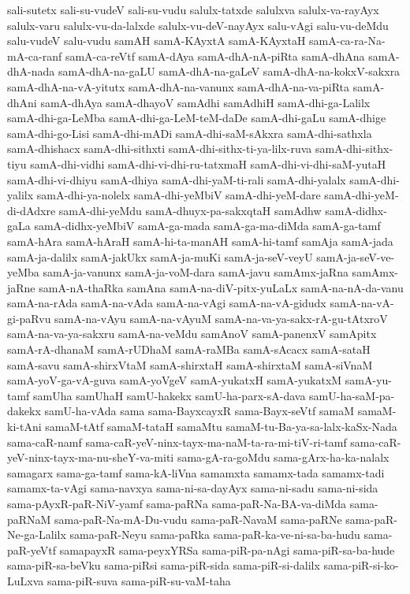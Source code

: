 {sali-sutetx
sali-su-vudeV
sali-su-vudu
salulx-tatxde
salulxva
salulx-va-rayAyx
salulx-varu
salulx-vu-da-lalxde
salulx-vu-deV-nayAyx
salu-vAgi
salu-vu-deMdu
salu-vudeV
salu-vudu
samAH
samA-KAyxtA
samA-KAyxtaH
samA-ca-ra-Na-mA-ca-ranf
samA-ca-reVtf
samA-dAya
samA-dhA-nA-piRta
samA-dhAna
samA-dhA-nada
samA-dhA-na-gaLU
samA-dhA-na-gaLeV
samA-dhA-na-kokxV-sakxra
samA-dhA-na-vA-yitutx
samA-dhA-na-vanunx
samA-dhA-na-va-piRta
samA-dhAni
samA-dhAya
samA-dhayoV
samAdhi
samAdhiH
samA-dhi-ga-Lalilx
samA-dhi-ga-LeMba
samA-dhi-ga-LeM-teM-daDe
samA-dhi-gaLu
samA-dhige
samA-dhi-go-Lisi
samA-dhi-mADi
samA-dhi-saM-sAkxra
samA-dhi-sathxla
samA-dhishacx
samA-dhi-sithxti
samA-dhi-sithx-ti-ya-lilx-ruva
samA-dhi-sithx-tiyu
samA-dhi-vidhi
samA-dhi-vi-dhi-ru-tatxmaH
samA-dhi-vi-dhi-saM-yutaH
samA-dhi-vi-dhiyu
samA-dhiya
samA-dhi-yaM-ti-rali
samA-dhi-yalalx
samA-dhi-yalilx
samA-dhi-ya-nolelx
samA-dhi-yeMbiV
samA-dhi-yeM-dare
samA-dhi-yeM-di-dAdxre
samA-dhi-yeMdu
samA-dhuyx-pa-sakxqtaH
samAdhw
samA-didhx-gaLa
samA-didhx-yeMbiV
samA-ga-mada
samA-ga-ma-diMda
samA-ga-tamf
samA-hAra
samA-hAraH
samA-hi-ta-manAH
samA-hi-tamf
samAja
samA-jada
samA-ja-dalilx
samA-jakUkx
samA-ja-muKi
samA-ja-seV-veyU
samA-ja-seV-ve-yeMba
samA-ja-vanunx
samA-ja-voM-dara
samA-javu
samAmx-jaRna
samAmx-jaRne
samA-nA-thaRka
samAna
samA-na-diV-pitx-yuLaLx
samA-na-nA-da-vanu
samA-na-rAda
samA-na-vAda
samA-na-vAgi
samA-na-vA-gidudx
samA-na-vA-gi-paRvu
samA-na-vAyu
samA-na-vAyuM
samA-na-va-ya-sakx-rA-gu-tAtxroV
samA-na-va-ya-sakxru
samA-na-veMdu
samAnoV
samA-panenxV
samApitx
samA-rA-dhanaM
samA-rUDhaM
samA-raMBa
samA-sAcacx
samA-sataH
samA-savu
samA-shirxVtaM
samA-shirxtaH
samA-shirxtaM
samA-siVnaM
samA-yoV-ga-vA-guva
samA-yoVgeV
samA-yukatxH
samA-yukatxM
samA-yu-tamf
samUha
samUhaH
samU-hakekx
samU-ha-parx-sA-dava
samU-ha-saM-pa-dakekx
samU-ha-vAda
sama
sama-BayxcayxR
sama-Bayx-seVtf
samaM
samaM-ki-tAni
samaM-tAtf
samaM-tataH
samaMtu
samaM-tu-Ba-ya-sa-lalx-kaSx-Nada
sama-caR-namf
sama-caR-yeV-ninx-tayx-ma-naM-ta-ra-mi-tiV-ri-tamf
sama-caR-yeV-ninx-tayx-ma-nu-sheY-va-miti
sama-gA-ra-goMdu
sama-gArx-ha-ka-nalalx
samagarx
sama-ga-tamf
sama-kA-liVna
samamxta
samamx-tada
samamx-tadi
samamx-ta-vAgi
sama-navxya
sama-ni-sa-dayAyx
sama-ni-sadu
sama-ni-sida
sama-pAyxR-paR-NiV-yamf
sama-paRNa
sama-paR-Na-BA-va-diMda
sama-paRNaM
sama-paR-Na-mA-Du-vudu
sama-paR-NavaM
sama-paRNe
sama-paR-Ne-ga-Lalilx
sama-paR-Neyu
sama-paRka
sama-paR-ka-ve-ni-sa-ba-hudu
sama-paR-yeVtf
samapayxR
sama-peyxYRSa
sama-piR-pa-nAgi
sama-piR-sa-ba-hude
sama-piR-sa-beVku
sama-piRsi
sama-piR-sida
sama-piR-si-dalilx
sama-piR-si-ko-LuLxva
sama-piR-suva
sama-piR-su-vaM-taha
}
